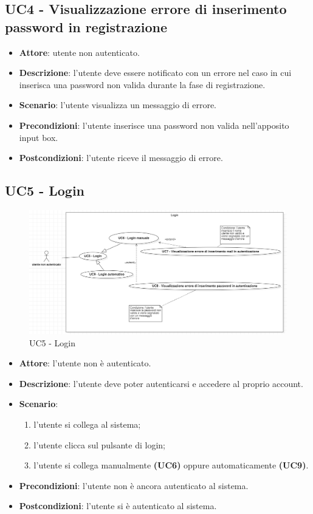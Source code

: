 \subsection{UC4 - Visualizzazione errore di inserimento password in registrazione}
\begin{itemize}
    \item \textbf{Attore}: utente non autenticato.
    \item \textbf{Descrizione}: l'utente deve essere notificato con un errore nel caso in cui inserisca una password non valida durante la fase di registrazione.
    \item \textbf{Scenario}: l'utente visualizza un messaggio di errore.
    \item \textbf{Precondizioni}: l'utente inserisce una password non valida nell'apposito input box.
    \item \textbf{Postcondizioni}: l'utente riceve il messaggio di errore.
\end{itemize}

\subsection{UC5 - Login}
\begin{figure}[!h]
    \includegraphics[width=15cm]{sezioni/Images/UC5-log.png}
    \centering
    \caption{UC5 - Login}
\end{figure}
\begin{itemize}
    \item \textbf{Attore}: l'utente non è autenticato.
    \item \textbf{Descrizione}: l'utente deve poter autenticarsi e accedere al proprio account.
    \item \textbf{Scenario}:
    \begin{enumerate}
        \item l'utente si collega al sistema;
        \item l'utente clicca sul pulsante di login;
        \item l'utente si collega manualmente \textbf{(UC6)} oppure automaticamente \textbf{(UC9)}.
    \end{enumerate}
    \item \textbf{Precondizioni}: l'utente non è ancora autenticato al sistema.
    \item \textbf{Postcondizioni}: l'utente si è autenticato al sistema.
\end{itemize}

